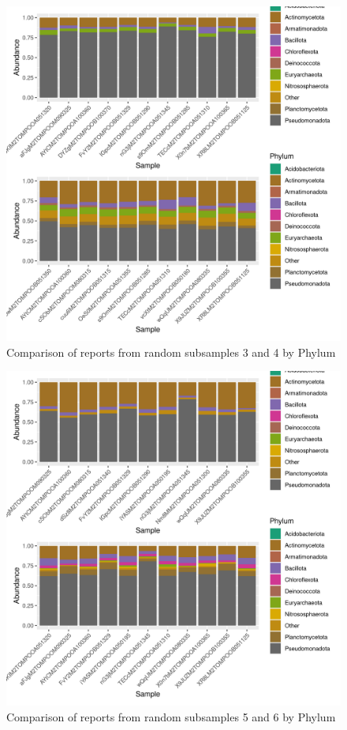 \documentclass{article}
\begin{document}
\begin{figure}
\centering
\includegraphics[scale=0.8]{otus_centrales_tomate_aleatorio1_3.csv_otus_centrales_tomate_aleatorio1_4.csv_relative_abundance_Phylum.png}
\caption{Comparison of reports from random subsamples 3 and 4 by Phylum}
\end{figure}


\begin{figure}
\centering
\includegraphics[scale=0.8]{otus_centrales_tomate_aleatorio1_5.csv_otus_centrales_tomate_aleatorio1_6.csv_relative_abundance_Phylum.png}
\caption{Comparison of reports from random subsamples 5 and 6 by Phylum}
\end{figure}
\end{document}
